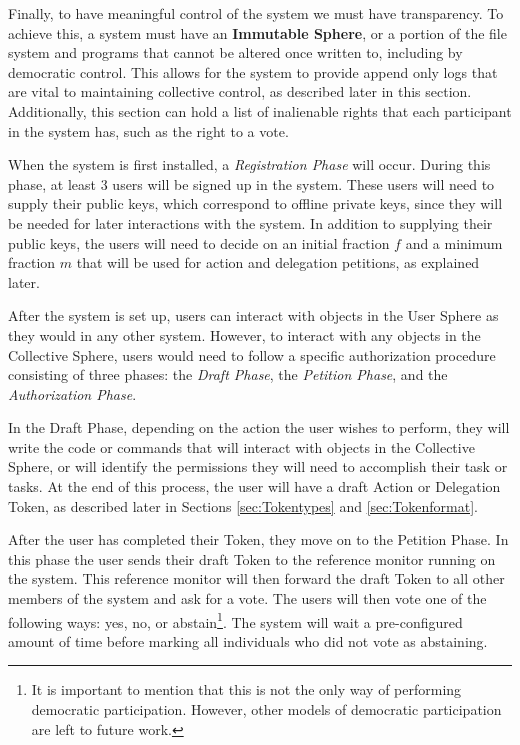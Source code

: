 Finally, to have meaningful control of the system we must have transparency. To
achieve this, a system must have an \textbf{Immutable Sphere}, or a portion of
the file system and programs that cannot be altered once written to, including
by democratic control. This allows for the system to provide append only logs
that are vital to maintaining collective control, as described later in this
section. Additionally, this section can hold a list of inalienable rights that
each participant in the system has, such as the right to a vote.

When the system is first installed, a \textit{Registration Phase} will occur.
During this phase, at least 3 users will be signed up in the system. These users
will need to supply their public keys, which correspond to offline private keys,
since they will be needed for later interactions with the system. In addition to
supplying their public keys, the users will need to decide on an initial
fraction $f$ and a minimum fraction $m$ that will be used for action and
delegation petitions, as explained later.

After the system is set up, users can interact with objects in the User Sphere
as they would in any other system. However, to interact with any objects in the
Collective Sphere, users would need to follow a specific authorization
procedure consisting of three phases: the \textit{Draft Phase}, the 
\textit{Petition Phase}, and the \textit{Authorization Phase}.

In the Draft Phase, depending on the action the user wishes to perform, they
will write the code or commands that will interact with objects in the
Collective Sphere, or will identify the permissions they will need to accomplish
their task or tasks. At the end of this process, the user will have a draft
Action or Delegation Token, as described later in Sections \ref{sec:Tokentypes}
and \ref{sec:Tokenformat}.

After the user has completed their Token, they move on to the Petition Phase. In
this phase the user sends their draft Token to the reference monitor running on
the system. This reference monitor will then forward the draft Token to all
other members of the system and ask for a vote. The users will then vote one of
the following ways: yes, no, or abstain\footnote{It is important to mention that
this is not the only way of performing democratic participation. However, other
models of democratic participation are left to future work.}. The system will
wait a pre-configured amount of time before marking all individuals who did not
vote as abstaining.


